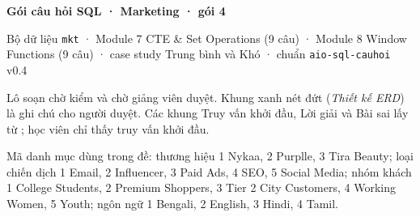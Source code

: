 \documentclass[11pt,a4paper]{article}
\begin{document}
{\LARGE\bfseries Gói câu hỏi SQL · Marketing · gói 4\par}
\medskip
{\color{cqMuted}Bộ dữ liệu \texttt{mkt} · Module 7 CTE \& Set Operations (9 câu) · Module 8 Window Functions (9 câu) · case study Trung bình và Khó · chuẩn \texttt{aio-sql-cauhoi} v0.4\par}
\bigskip
Lô soạn chờ kiểm và chờ giảng viên duyệt. Khung xanh nét đứt (\emph{Thiết kế ERD}) là ghi chú cho người duyệt. Các khung Truy vấn khởi đầu, Lời giải và Bài sai lấy từ ; học viên chỉ thấy truy vấn khởi đầu.

Mã danh mục dùng trong đề: thương hiệu  1 Nykaa, 2 Purplle, 3 Tira Beauty; loại chiến dịch  1 Email, 2 Influencer, 3 Paid Ads, 4 SEO, 5 Social Media; nhóm khách  1 College Students, 2 Premium Shoppers, 3 Tier 2 City Customers, 4 Working Women, 5 Youth; ngôn ngữ  1 Bengali, 2 English, 3 Hindi, 4 Tamil.

\tableofcontents


\end{document}

